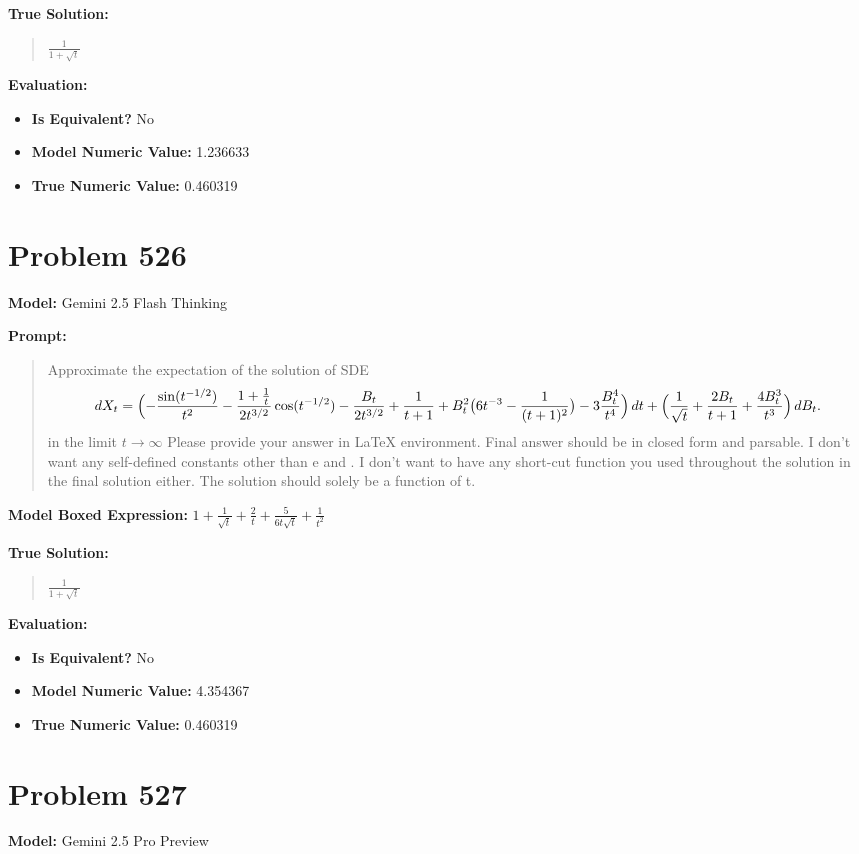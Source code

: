 \documentclass{article}
\begin{document}
\textbf{True Solution:}
\begin{quote}
$\frac{1}{1 + \sqrt{t}}$
\end{quote}

\textbf{Evaluation:}
\begin{itemize}
\item \textbf{Is Equivalent?} No
\item \textbf{Model Numeric Value:} 1.236633
\item \textbf{True Numeric Value:} 0.460319
\end{itemize}
\vspace{1cm}
\section*{Problem 526}
\textbf{Model:} Gemini 2.5 Flash Thinking

\textbf{Prompt:}
\begin{quote}
Approximate the expectation of the solution of SDE $$dX_t = \Bigl(-\frac{\sin(t^{-1/2})}{t^2}-\frac{1+\tfrac1t}{2t^{3/2}}\cos(t^{-1/2})-\frac{B_t}{2t^{3/2}}+\frac1{t+1}+B_t^2\bigl(6t^{-3}-\frac1{(t+1)^2}\bigr)-3\frac{B_t^4}{t^4}\Bigr)\,dt + \Bigl(\frac1{\sqrt t}+\frac{2B_t}{t+1}+\frac{4B_t^3}{t^3}\Bigr)\,dB_t.$$ in the limit $t \to \infty$ Please provide your answer in LaTeX \boxed{} environment. Final answer should be in closed form and parsable. I don't want any self-defined constants other than e and \pi. I don't want to have any short-cut function you used throughout the solution in the final solution either. The solution should solely be a function of t.
\end{quote}
\textbf{Model Boxed Expression:} $1 + \frac{1}{\sqrt{t}} + \frac{2}{t} + \frac{5}{6t\sqrt{t}} + \frac{1}{t^2}$

\textbf{True Solution:}
\begin{quote}
$\frac{1}{1 + \sqrt{t}}$
\end{quote}

\textbf{Evaluation:}
\begin{itemize}
\item \textbf{Is Equivalent?} No
\item \textbf{Model Numeric Value:} 4.354367
\item \textbf{True Numeric Value:} 0.460319
\end{itemize}
\vspace{1cm}
\section*{Problem 527}
\textbf{Model:} Gemini 2.5 Pro Preview
\end{document}
